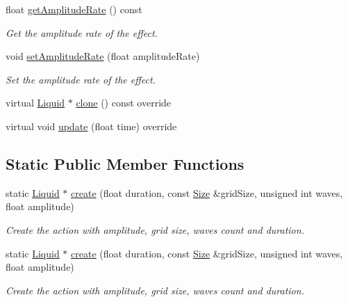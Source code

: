 \begin{DoxyCompactItemize}
float \hyperlink{classLiquid_ad2061dd34f3cf9f30a416f15c9bcbad1}{get\+Amplitude\+Rate} () const
\begin{DoxyCompactList}\small\item\em Get the amplitude rate of the effect. \end{DoxyCompactList}\item 
void \hyperlink{classLiquid_a2472c32e0f54760e8bfb9c2b21424220}{set\+Amplitude\+Rate} (float amplitude\+Rate)
\begin{DoxyCompactList}\small\item\em Set the amplitude rate of the effect. \end{DoxyCompactList}\item 
virtual \hyperlink{classLiquid}{Liquid} $\ast$ \hyperlink{classLiquid_a18fdff260e28b3bb195563cd8e60fdc3}{clone} () const override
\item 
virtual void \hyperlink{classLiquid_a30119c518173d6edab4307a9ea481b0f}{update} (float time) override
\end{DoxyCompactItemize}
\subsection*{Static Public Member Functions}
\begin{DoxyCompactItemize}
\item 
static \hyperlink{classLiquid}{Liquid} $\ast$ \hyperlink{classLiquid_ad926bdd03ee2d6b1dc5bddd307f384d4}{create} (float duration, const \hyperlink{classSize}{Size} \&grid\+Size, unsigned int waves, float amplitude)
\begin{DoxyCompactList}\small\item\em Create the action with amplitude, grid size, waves count and duration. \end{DoxyCompactList}\item 
static \hyperlink{classLiquid}{Liquid} $\ast$ \hyperlink{classLiquid_ae9610fe21338c0e223fa6eb4015fbadd}{create} (float duration, const \hyperlink{classSize}{Size} \&grid\+Size, unsigned int waves, float amplitude)
\begin{DoxyCompactList}\small\item\em Create the action with amplitude, grid size, waves count and duration. \end{DoxyCompactList}\end{DoxyCompactItemize}
